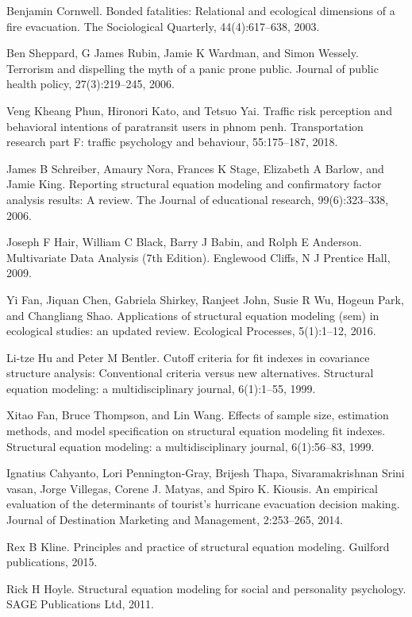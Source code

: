 \documentclass[letterpaper,12pt,titlepage,oneside,final,a4j,dvipdfmx]{book}
\begin{document}
\begin{thebibliography}{70}
  Benjamin Cornwell. Bonded fatalities: Relational and ecological dimensions of a fire evacuation. The Sociological Quarterly, 44(4):617–638, 2003.

 Ben Sheppard, G James Rubin, Jamie K Wardman, and Simon Wessely. Terrorism and dispelling the myth of a panic prone public. Journal of public health policy, 27(3):219–245, 2006.

  Veng Kheang Phun, Hironori Kato, and Tetsuo Yai. Traffic risk perception and behavioral intentions of paratransit users in phnom penh. Transportation research part F: traffic psychology and behaviour, 55:175–187, 2018.


  James B Schreiber, Amaury Nora, Frances K Stage, Elizabeth A Barlow, and Jamie King. Reporting structural equation modeling and confirmatory factor analysis results: A review. The Journal of educational research, 99(6):323–338, 2006.

 Joseph F Hair, William C Black, Barry J Babin, and Rolph E Anderson. Multivariate Data Analysis (7th Edition). Englewood Cliffs, N J Prentice Hall, 2009.


 Yi Fan, Jiquan Chen, Gabriela Shirkey, Ranjeet John, Susie R Wu, Hogeun Park, and Changliang Shao. Applications of structural equation modeling (sem) in ecological studies: an updated review. Ecological Processes, 5(1):1–12, 2016.

 Li-tze Hu and Peter M Bentler. Cutoff criteria for fit indexes in covariance structure analysis: Conventional criteria versus new alternatives. Structural equation modeling: a multidisciplinary journal, 6(1):1–55, 1999.

 Xitao Fan, Bruce Thompson, and Lin Wang. Effects of sample size, estimation methods, and model specification on structural equation modeling fit indexes. Structural equation modeling: a multidisciplinary journal, 6(1):56–83, 1999.

 Ignatius Cahyanto, Lori Pennington-Gray, Brijesh Thapa, Sivaramakrishnan Srini vasan, Jorge Villegas, Corene J. Matyas, and Spiro K. Kiousis. An empirical evaluation of the determinants of tourist's hurricane evacuation decision making. Journal of Destination Marketing and Management, 2:253–265, 2014.

 Rex B Kline. Principles and practice of structural equation modeling. Guilford publications, 2015.

 Rick H Hoyle. Structural equation modeling for social and personality psychology. SAGE Publications Ltd, 2011.


\end{thebibliography}
\end{document}
